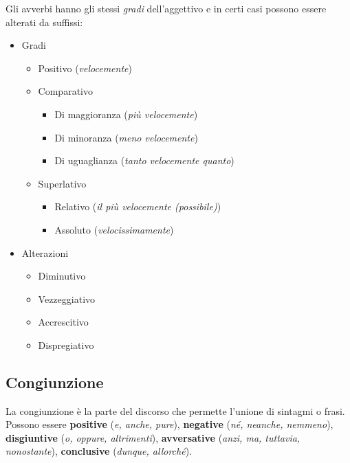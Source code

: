 \documentclass[a4paper,twoside,11pt,chapterprefix=false,bibliography=totocnumbered,listof=flat]{scrbook}
\providecommand{\tightlist}{%
  \setlength{\itemsep}{0pt}\setlength{\parskip}{0pt}}
\begin{document}
Gli avverbi hanno gli stessi \emph{gradi} dell'aggettivo e in certi casi
possono essere alterati da suffissi:

\begin{itemize}
\tightlist
\item
  Gradi

  \begin{itemize}
  \tightlist
  \item
    Positivo (\emph{velocemente})
  \item
    Comparativo

    \begin{itemize}
    \tightlist
    \item
      Di maggioranza (\emph{più velocemente})
    \item
      Di minoranza (\emph{meno velocemente})
    \item
      Di uguaglianza (\emph{tanto velocemente quanto})
    \end{itemize}
  \item
    Superlativo

    \begin{itemize}
    \tightlist
    \item
      Relativo (\emph{il più velocemente (possibile)})
    \item
      Assoluto (\emph{velocissimamente})
    \end{itemize}
  \end{itemize}
\item
  Alterazioni

  \begin{itemize}
  \tightlist
  \item
    Diminutivo
  \item
    Vezzeggiativo
  \item
    Accrescitivo
  \item
    Dispregiativo
  \end{itemize}
\end{itemize}

\hypertarget{congiunzione}{%
\subsection{Congiunzione}\label{congiunzione}}

La congiunzione è la parte del discorso che permette l'unione di
sintagmi o frasi. Possono essere \textbf{positive} (\emph{e, anche,
pure}), \textbf{negative} (\emph{né, neanche, nemmeno}),
\textbf{disgiuntive} (\emph{o, oppure, altrimenti}),
\textbf{avversative} (\emph{anzi, ma, tuttavia, nonostante}),
\textbf{conclusive} (\emph{dunque, allorché}).
\end{document}
